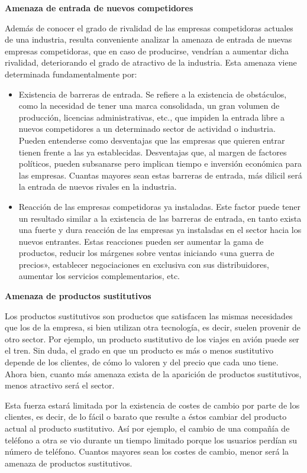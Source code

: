 \documentclass[
]{krantz}
\providecommand{\tightlist}{%
  \setlength{\itemsep}{0pt}\setlength{\parskip}{0pt}}
\begin{document}
\textbf{Amenaza de entrada de nuevos competidores}

Además de conocer el grado de rivalidad de las empresas competidoras actuales de una industria, resulta conveniente analizar la amenaza de entrada de nuevas empresas competidoras, que en caso de producirse, vendrían a aumentar dicha rivalidad, deteriorando el grado de atractivo de la industria. Esta amenaza viene determinada fundamentalmente por:

\begin{itemize}
\tightlist
\item
  Existencia de barreras de entrada. Se refiere a la existencia de obstáculos, como la necesidad de tener una marca consolidada, un gran volumen de producción, licencias administrativas, etc., que impiden la entrada libre a nuevos competidores a un determinado sector de actividad o industria. Pueden entenderse como desventajas que las empresas que quieren entrar tienen frente a las ya establecidas. Desventajas que, al margen de factores políticos, pueden subsanarse pero implican tiempo e inversión económica para las empresas. Cuantas mayores sean estas barreras de entrada, más dilicil será la entrada de nuevos rivales en la industria.
\item
  Reacción de las empresas competidoras ya instaladas. Este factor puede tener un resultado similar a la existencia de las barreras de entrada, en tanto exista una fuerte y dura reacción de las empresas ya instaladas en el sector hacia los nuevos entrantes. Estas reacciones pueden ser aumentar la gama de productos, reducir los márgenes sobre ventas iniciando «una guerra de precios», establecer negociaciones en exclusiva con sus distribuidores, aumentar los servicios complementarios, etc.
\end{itemize}

\textbf{Amenaza de productos sustitutivos}

Los productos sustitutivos son productos que satisfacen las mismas necesidades que los de la empresa, si bien utilizan otra tecnología, es decir, suelen provenir de otro sector. Por ejemplo, un producto sustitutivo de los viajes en avión puede ser el tren. Sin duda, el grado en que un producto es más o menos sustitutivo depende de los clientes, de cómo lo valoren y del precio que cada uno tiene. Ahora bien, cuanto más amenaza exista de la aparición de productos sustitutivos, menos atractivo será el sector.

Esta fuerza estará limitada por la existencia de costes de cambio por parte de los clientes, es decir, de lo fácil o barato que resulte a éstos cambiar del producto actual al producto sustitutivo. Así por ejemplo, el cambio de una compañía de teléfono a otra se vio durante un tiempo limitado porque los usuarios perdían su número de teléfono. Cuantos mayores sean los costes de cambio, menor será la amenaza de productos sustitutivos.
\end{document}
